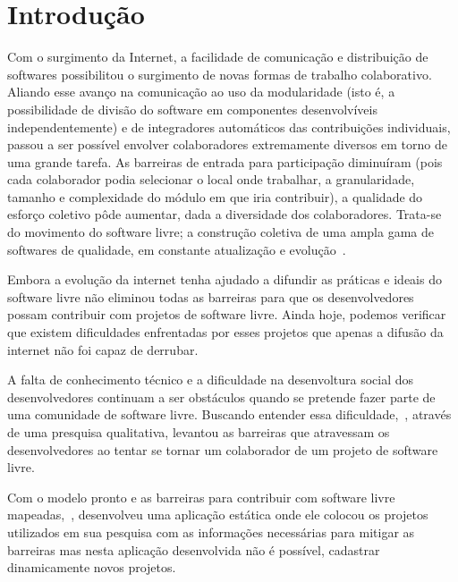 \chapter{Introdução}

Com o surgimento da Internet, a facilidade de comunicação e distribuição de 
softwares possibilitou o surgimento de novas formas de trabalho colaborativo.
Aliando esse avanço na comunicação ao uso da modularidade (isto é, a possibilidade 
de divisão do software em componentes desenvolvíveis independentemente) e de 
integradores automáticos das contribuições individuais, passou a ser possível 
envolver colaboradores extremamente diversos em torno de uma grande tarefa. 
As barreiras de entrada para participação diminuíram (pois cada colaborador podia 
selecionar o local onde trabalhar, a granularidade, tamanho e complexidade do módulo 
em que iria contribuir), a qualidade do esforço coletivo pôde aumentar, dada a 
diversidade dos colaboradores. Trata-se do movimento do software livre; 
a construção coletiva de uma ampla gama de softwares de qualidade, em constante 
atualização e evolução~\cite{simon2010rossio}.

Embora a evolução da internet tenha ajudado a difundir as práticas e ideais do
software livre não eliminou todas as barreiras para que os desenvolvedores possam
contribuir com projetos de software livre. Ainda hoje, podemos verificar que 
existem dificuldades enfrentadas por esses projetos que apenas a difusão da internet 
não foi capaz de derrubar.

A falta de conhecimento técnico e a dificuldade na desenvoltura social dos desenvolvedores
continuam a ser obstáculos quando se pretende fazer parte de uma comunidade de software
livre. Buscando entender essa dificuldade,~, 
através de uma presquisa qualitativa, levantou as barreiras que atravessam os desenvolvedores 
ao tentar se tornar um colaborador de um projeto de software livre.

Com o modelo pronto e as barreiras para contribuir com software livre mapeadas,~,
desenvolveu uma aplicação estática onde ele colocou os projetos 
utilizados em sua pesquisa com as informações necessárias para mitigar as barreiras
mas nesta aplicação desenvolvida não é possível, cadastrar dinamicamente novos projetos.

